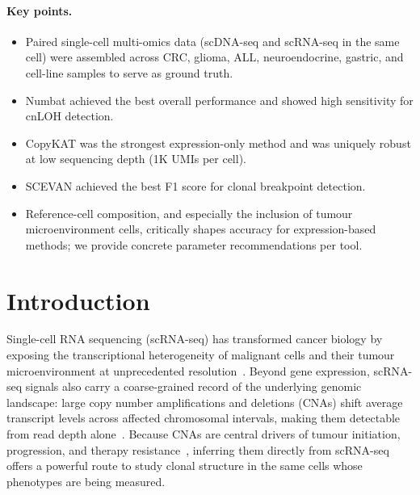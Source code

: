 \documentclass[11pt]{article}
\begin{document}
\paragraph{Key points.}
\begin{itemize}
\setlength{\itemsep}{0pt}
  \item Paired single-cell multi-omics data (scDNA-seq and scRNA-seq in the
    same cell) were assembled across CRC, glioma, ALL, neuroendocrine, gastric,
    and cell-line samples to serve as ground truth.
  \item Numbat achieved the best overall performance and showed high
    sensitivity for cnLOH detection.
  \item CopyKAT was the strongest expression-only method and was uniquely
    robust at low sequencing depth (1K UMIs per cell).
  \item SCEVAN achieved the best F1 score for clonal breakpoint detection.
  \item Reference-cell composition, and especially the inclusion of tumour
    microenvironment cells, critically shapes accuracy for expression-based
    methods; we provide concrete parameter recommendations per tool.
\end{itemize}

\section{Introduction}

Single-cell RNA sequencing (scRNA-seq) has transformed cancer biology by
exposing the transcriptional heterogeneity of malignant cells and their
tumour microenvironment at unprecedented resolution~\cite{tang2009mrnaseq,
patel2014single,tirosh2016dissecting}. Beyond gene expression, scRNA-seq
signals also carry a coarse-grained record of the underlying genomic
landscape: large copy number amplifications and deletions (CNAs) shift
average transcript levels across affected chromosomal intervals, making
them detectable from read depth alone~\cite{patel2014single,
beroukhim2010landscape}. Because CNAs are central drivers of tumour
initiation, progression, and therapy resistance~\cite{beroukhim2010landscape,
stephens2011chromothripsis,mcgranahan2017clonal}, inferring them directly
from scRNA-seq offers a powerful route to study clonal structure in the
same cells whose phenotypes are being measured.
\end{document}
